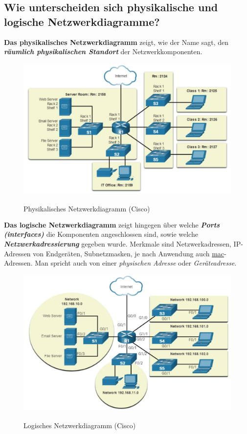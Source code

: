 \subsection*{Wie unterscheiden sich physikalische und logische Netzwerkdiagramme?}
\textbf{Das physikalisches Netzwerkdiagramm} zeigt, wie der Name sagt, den \textsl{\textbf{räumlich physikalischen Standort}} der Netzwerkkomponenten.
\begin{figure}[H]
    \begin{center}
    \label{pic:physical_topology}
    \includegraphics[width=\textwidth]{images/physical_topology_diagram.jpg}
    \caption{Physikalisches Netzwerkdiagramm (\textsuperscript{\textcopyright}Cisco)}
    \end{center}
\end{figure}
\textbf{Das logische Netzwerkdiagramm} zeigt hingegen über welche \textsl{\textbf{Ports (interfaces)}} die Komponenten angeschlossen sind, sowie welche \textsl{\textbf{Netzwerkadressierung}} gegeben wurde. Merkmale sind Netzwerkadressen, IP-Adressen von Endgeräten, Subnetzmasken, je nach Anwendung auch \underline{\acrshort{mac}}-Adressen. Man spricht auch von einer \textsl{physischen Adresse} oder \textsl{Geräteadresse}.
\begin{figure}[H]
    \begin{center}
    \label{pic:logical_topology}
    \includegraphics[width=\textwidth]{images/logical_topology_diagram.jpg}
    \caption{Logisches Netzwerkdiagramm (\textsuperscript{\textcopyright}Cisco)}
    \end{center}
\end{figure}

